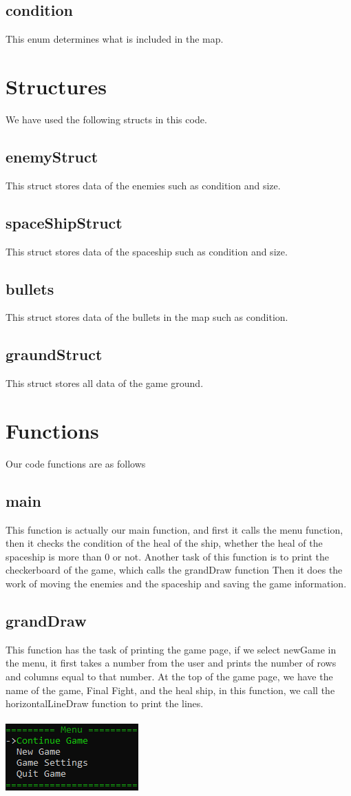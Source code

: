 \documentclass[12pt,a4paper]{article}
\begin{document}
	\subsection{condition}
	This enum determines what is included in the map.
	\section{Structures}\label{description.structs}
	We have used the following structs in this code.
	\subsection{enemyStruct}
	This struct stores data of the enemies such as condition and size.
	\subsection{spaceShipStruct}
	This struct stores data of the spaceship such as condition and size.
	\subsection{bullets}
	This struct stores data of the bullets in the map such as condition.
	\subsection{graundStruct}
	This struct stores all data of the game ground.
	\section{Functions}\label{description.func}
	Our code functions are as follows
	\subsection{main}
	This function is actually our main function, and first it calls the menu function, then it checks the condition of the heal of the ship, whether the heal of the spaceship is more than 0 or not.
    Another task of this function is to print the checkerboard of the game, which calls the grandDraw function
    Then it does the work of moving the enemies and the spaceship and saving the game information.
	
	\subsection{grandDraw}
	This function has the task of printing the game page, if we select newGame in the menu, it first takes a number from the user and prints the number of rows and columns equal to that number.
    At the top of the game page, we have the name of the game, Final Fight, and the heal ship, in this function, we call the horizontalLineDraw function to print the lines.\\ \\
	\includegraphics[scale = 1]{Graphics/menu.png}
\end{document}
